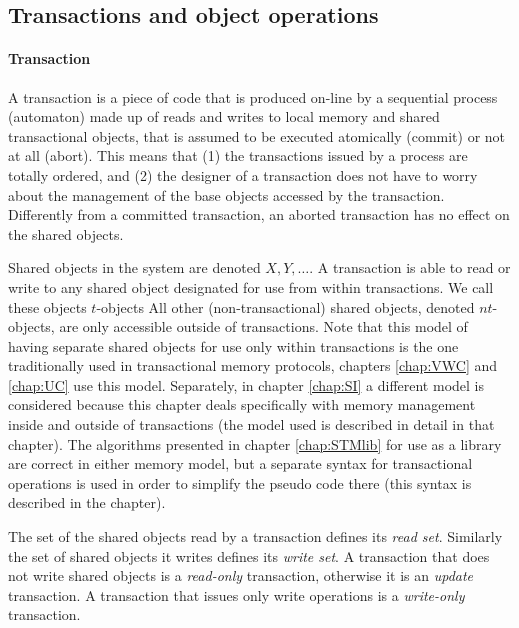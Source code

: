 \subsection{Transactions and object operations}
\label{base-definitions}

\paragraph{Transaction}
A transaction is  a piece of code that is produced  on-line by a sequential
process (automaton)
made up of reads and writes to local memory and shared transactional objects,
that is assumed to be executed  atomically (commit) or
not  at all  (abort). This  means  that (1)  the transactions  issued by  a
process are totally ordered, and (2) the designer of a transaction does 
not have to  worry about the  management of the  base objects  accessed  
by the transaction.  Differently from  a committed transaction, an aborted  
transaction has no effect on the shared objects.

Shared objects in the system are  denoted $X,Y,\ldots$.
A transaction is able to read or write to any shared object designated
for use from within transactions.
We call these objects $t$-objects
All other (non-transactional) shared objects, denoted $nt$-objects,
are only accessible outside of transactions.
Note that this model of having separate shared objects for use only within transactions
is the one traditionally used in transactional memory
protocols, chapters \ref{chap:VWC} and \ref{chap:UC} use this model.
Separately, in chapter \ref{chap:SI} a different model is considered
because this chapter deals specifically with memory management
inside and outside of transactions (the model used is described in detail in that chapter).
The algorithms presented in chapter \ref{chap:STMlib} for use as a library are correct in either memory model,
but a separate syntax for transactional operations is used
in order to simplify the pseudo code there (this syntax is described in the chapter).

The set of the shared objects read by a transaction  defines its
{\it read  set}.  Similarly the set  of shared objects it writes  defines its 
{\it write set}. A transaction that does not  write shared objects is 
a  {\it  read-only}  transaction, otherwise it is an {\it update}
transaction.  A transaction that issues only write operations is 
a {\it write-only}  transaction. 

